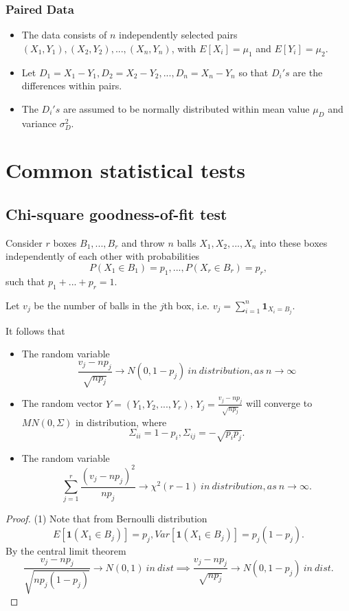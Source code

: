 \begin{refsection}
\subsubsection{Paired Data}



\begin{note}\hfill
\begin{itemize}
	\item The data consists of $n$ independently selected pairs $(X_1,Y_1), (X_2,Y_2),...,(X_n,Y_n)$, with $E[X_i] = \mu_1$ and $E[Y_i] = \mu_2$. 
	\item Let $D_1 = X_1-Y_1, D_2 = X_2 - Y_2,..., D_n = X_n - Y_n$ so that $D_i's$ are the differences within pairs. 
	\item The $D_i's$ are assumed to be normally distributed within mean value $\mu_D$ and variance $\sigma_D^2$.
\end{itemize}	
\end{note}




\section{Common statistical tests}

\subsection{Chi-square goodness-of-fit test}



\begin{theorem}\label{ch:theory-of-statistics:th:PearsonTheorem}
	Consider $r$ boxes $B_1,...,B_r$ and throw $n$ balls $X_1,X_2,...,X_n$ into these boxes independently of each other with probabilities $$P(X_1\in B_1) = p_1,..., P(X_r \in B_r) = p_r,$$
	such that $p_1+...+p_r = 1$. 
	
	Let $v_j$ be the number of balls in the $j$th box, i.e. $v_j = \sum_{i=1}^n \bm{1}_{X_i = B_j}.$
	
	It follows that 
	\begin{itemize}
		\item The random variable
		$$\frac{v_j - np_j}{\sqrt{np_j}} \to N(0,1-p_j) ~in~distribution, as~ n \to \infty $$
		\item The random vector $Y=(Y_1,Y_2,...,Y_r)$, $Y_j = \frac{v_j - np_j}{\sqrt{np_j}}$ will converge to $MN(0,\Sigma)$ in distribution, where
		$$\Sigma_{ii} = 1- p_i, \Sigma_{ij} = -\sqrt{p_ip_j}.$$
		\item The random variable 
		$$\sum_{j=1}^r \frac{(v_j - np_j)^2}{np_j}\to \chi^2(r-1) ~in~distribution, as~ n \to \infty.$$
	\end{itemize}
\end{theorem}
\begin{proof}
	(1) Note that from Bernoulli distribution $$E[\bm{1}(X_1\in B_j)] = p_j, Var[\bm{1}(X_1\in B_j)] = p_j(1-p_j).$$
	By the central limit theorem
	$$\frac{v_j - np_j}{\sqrt{np_j(1-p_j)}} \to N(0,1) ~in~dist \implies \frac{v_j - np_j}{\sqrt{np_j}} \to N(0,1-p_j) ~in~dist.$$
	

\end{proof}
\end{refsection}
